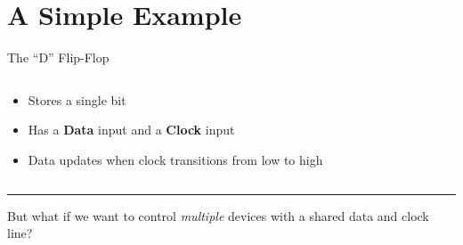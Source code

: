 \documentclass{beamer}
\begin{document}
\section{A Simple Example}
\begin{frame}{The ``D'' Flip-Flop}
    \begin{columns}
        \begin{column}{0.33\textwidth}
            {\footnotesize
            \begin{itemize}
                \item Stores a single bit
                \item Has a \textbf{Data} input and a \textbf{Clock} input
                \item Data updates when clock transitions from low to high
            \end{itemize}
            }
        \end{column}
        \begin{column}{0.66\textwidth}
            \begin{figure}
            \end{figure}
        \end{column}
    \end{columns}
    \pause
    \vspace{.1in}
    \hrule
    But what if we want to control \emph{multiple} devices with a shared data and clock line?
\end{frame}
\end{document}
